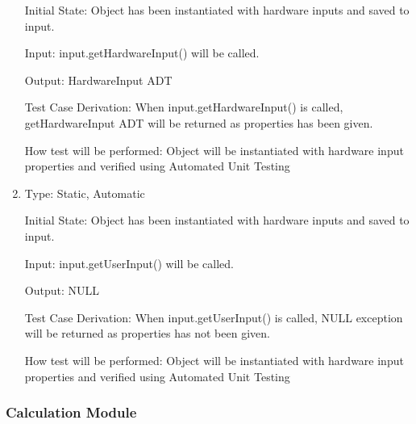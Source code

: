 \documentclass[12pt, titlepage]{article}
\begin{document}
\begin{enumerate}[{UT-IC}1.]
Initial State: Object has been instantiated with hardware inputs and saved to input.
					
Input: input.getHardwareInput() will be called.
					
Output: HardwareInput ADT

Test Case Derivation: When input.getHardwareInput() is called, getHardwareInput ADT will be returned as properties has been given.


How test will be performed: Object will be instantiated with hardware input properties and verified using Automated Unit Testing 

\item

Type: Static, Automatic
					
Initial State: Object has been instantiated with hardware inputs and saved to input.
					
Input: input.getUserInput() will be called.
					
Output: NULL

Test Case Derivation: When input.getUserInput() is called, NULL exception will be returned as properties has not been given.


How test will be performed: Object will be instantiated with hardware input properties and verified using Automated Unit Testing


\end{enumerate}

\subsubsection{Calculation Module }
\end{document}
